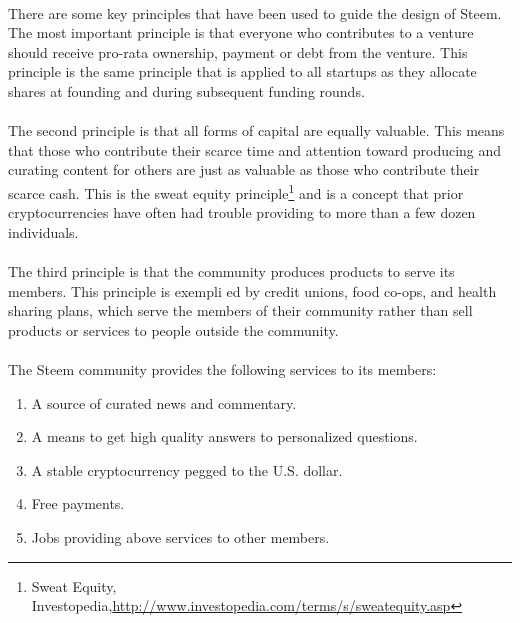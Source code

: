 \documentclass{article}
\begin{document}
        \paragraph{}
            There are some key principles that have been used to guide the design of Steem. The most important principle is that everyone who contributes to a venture should receive pro-rata ownership, payment or debt from the venture. This principle is the same principle that is applied to all startups as they allocate shares at founding and during subsequent funding rounds.

        \paragraph{}
            The second principle is that all forms of capital are equally valuable. This means that those who contribute their scarce time and attention toward producing and curating content for others are just as valuable as those who contribute their scarce cash. This is the sweat equity principle\footnote{Sweat Equity, Investopedia,\newline\url{http://www.investopedia.com/terms/s/sweatequity.asp}} and is a concept that prior cryptocurrencies have often had trouble providing to more than a few dozen individuals.

        \paragraph{}
            The third principle is that the community produces products to serve its members. This principle is exempli ed by credit unions, food co-ops, and health sharing plans, which serve the members of their community rather than sell products or services to people outside the community.

        \paragraph{}
            The Steem community provides the following services to its members:

        \begin{enumerate}
            \item A source of curated news and commentary.
            \item A means to get high quality answers to personalized questions.
            \item A stable cryptocurrency pegged to the U.S. dollar.
            \item Free payments.
            \item Jobs providing above services to other members.
        \end{enumerate}
\end{document}
